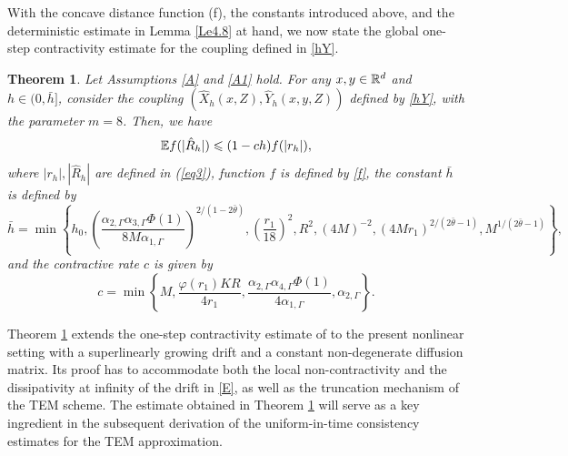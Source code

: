 \documentclass[aap]{imsart}
\theoremstyle{plain}
\newtheorem{theorem}{Theorem}[section]
\theoremstyle{definition}
\begin{document}
With the concave distance function (f), the constants introduced above, and the deterministic estimate in Lemma \ref{Le4.8} at hand, we now state the global one-step contractivity estimate for the coupling defined in \eqref{hY}.

\begin{theorem}\label{Th1}
Let Assumptions \ref{A} and \ref{A1} hold.
For any $x, y\in\mathbb{R}^d$ and \(h \in (0, \bar{h}]\), consider the coupling $(\hat{X}_h(x,Z), \hat{Y}_h(x,y,Z))$ defined by \eqref{hY}, with the parameter $m=8$. Then, we have
\begin{equation*}
\mathbb{E} f(|\hat{R}_h|)\leqslant (1-ch)f(|r_h|),
\end{equation*}
where $|r_h|, |\hat{R}_h|$ are defined in (\ref{eq3}), function $f$ is defined by \eqref{f}, 
the constant $\bar{h}$ is defined by
\begin{equation}\label{bar}
\bar{h}=\min\left\{h_0, \left(\frac{\alpha_{2, \Gamma}\alpha_{3, \Gamma}\Phi(1)}{8M\alpha_{1, \Gamma}}\right)^{2/(1-2\bar{\theta})}, \left(\frac{r_1}{18}\right)^2, R^2, (4M)^{-2}, (4Mr_1)^{2/(2\bar{\theta}-1)}, M^{1/(2\bar{\theta}-1)}\right\},
\end{equation}
and the contractive rate $c$ is given by 
\begin{equation*}
c = \min\left\{M, \frac{\varphi(r_1)KR }{4r_1}, \frac{\alpha_{2, \Gamma}\alpha_{4, \Gamma}\Phi(1)}{4\alpha_{1, \Gamma}}, \alpha_{2, \Gamma}\right\}.
\end{equation*}
\end{theorem}

Theorem \ref{Th1} extends the one-step contractivity estimate of \cite[Theorem 2.1]{Majka} to the present nonlinear setting with a superlinearly growing drift and a constant non-degenerate diffusion matrix. Its proof has to accommodate both the local non-contractivity and the dissipativity at infinity of the drift in \eqref{E}, as well as the truncation mechanism of the TEM scheme. The estimate obtained in Theorem \ref{Th1} will serve as a key ingredient in the subsequent derivation of the uniform-in-time consistency estimates for the TEM approximation.
\end{document}
